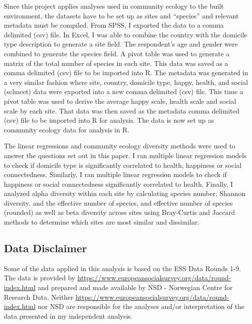 Since this project applies analyses used in community ecology to the
built environment, the datasets have to be set up as sites and
``species'' and relevant metadata must be compiled. From SPSS, I
exported the data to a comma delimited (csv) file. In Excel, I was able
to combine the country with the domicile type description to generate a
site field. The respondent's age and gender were combined to generate
the species field. A pivot table was used to generate a matrix of the
total number of species in each site. This data was saved as a comma
delimited (csv) file to be imported into R. The metadata was generated
in a very similar fashion where site, country, domicile type, happy,
health, and social (sclmeet) data were exported into a new comma
delimited (csv) file. This time a pivot table was used to derive the
average happy scale, health scale and social scale by each site. That
data was then saved as the metadata comma delimited (csv) file to be
imported into R for analysis. The data is now set up as community
ecology data for analysis in R.

The linear regressions and community ecology diversity methods were used
to answer the questions set out in this paper. I ran multiple linear
regression models to check if domicile type is significantly correlated
to health, happiness or social connectedness. Similarly, I ran multiple
linear regression models to check if happiness or social connectedness
significantly correlated to health. Finally, I analyzed alpha diversity
within each site by calculating species number, Shannon diversity, and
the effective number of species, and effective number of species
(rounded) as well as beta diversity across sites using Bray-Curtis and
Jaccard methods to determine which sites are most similar and
dissimilar.

\hypertarget{data-disclaimer}{%
\subsection{Data Disclaimer}\label{data-disclaimer}}

Some of the data applied in this analysis is based on the ESS Data
Rounds 1-9. The data is provided by
\url{https://www.europeansocialsurvey.org/data/round-index.html} and
prepared and made available by NSD - Norwegian Centre for Research Data.
Neither \url{https://www.europeansocialsurvey.org/data/round-index.html}
nor NSD are responsible for the analyses and/or interpretation of the
data presented in my independent analysis.


